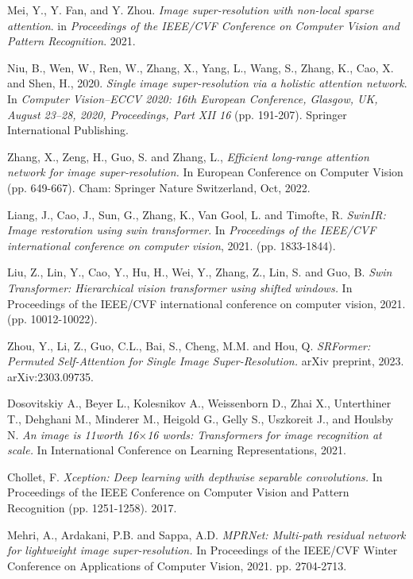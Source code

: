 \documentclass[twocolumn]{svjour3}          %
\begin{document}
\begin{thebibliography}{00}
 Mei, Y., Y. Fan, and Y. Zhou. \textit{Image super-resolution with non-local sparse attention}. in \textit{Proceedings of the IEEE/CVF Conference on Computer Vision and Pattern Recognition}. 2021.

 Niu, B., Wen, W., Ren, W., Zhang, X., Yang, L., Wang, S., Zhang, K., Cao, X. and Shen, H., 2020. \textit{Single image super-resolution via a holistic attention network}. In \textit{Computer Vision–ECCV 2020: 16th European Conference, Glasgow, UK, August 23–28, 2020, Proceedings, Part XII 16} (pp. 191-207). Springer International Publishing.

 Zhang, X., Zeng, H., Guo, S. and Zhang, L., \textit{Efficient long-range attention network for image super-resolution.} In European Conference on Computer Vision (pp. 649-667). Cham: Springer Nature Switzerland, Oct, 2022.

 Liang, J., Cao, J., Sun, G., Zhang, K., Van Gool, L. and Timofte, R. \textit{SwinIR: Image restoration using swin transformer}. In \textit{Proceedings of the IEEE/CVF international conference on computer vision}, 2021. (pp. 1833-1844).

 Liu, Z., Lin, Y., Cao, Y., Hu, H., Wei, Y., Zhang, Z., Lin, S. and Guo, B. \textit{Swin Transformer: Hierarchical vision transformer using shifted windows.} In Proceedings of the IEEE/CVF international conference on computer vision, 2021. (pp. 10012-10022).

 Zhou, Y., Li, Z., Guo, C.L., Bai, S., Cheng, M.M. and Hou, Q. \textit{SRFormer: Permuted Self-Attention for Single Image Super-Resolution.} arXiv preprint, 2023. arXiv:2303.09735.

 Dosovitskiy A., Beyer L., Kolesnikov A., Weissenborn D., Zhai X., Unterthiner T., Dehghani M., Minderer M., Heigold G., Gelly S., Uszkoreit J., and Houlsby N. \textit{An image is 11worth 16$\times$16 words: Transformers for image recognition at scale.} In International Conference on Learning Representations, 2021.

 Chollet, F. \textit{Xception: Deep learning with depthwise separable convolutions.} In Proceedings of the IEEE Conference on Computer Vision and Pattern Recognition (pp. 1251-1258). 2017.

 Mehri, A., Ardakani, P.B. and Sappa, A.D. \textit{MPRNet: Multi-path residual network for lightweight image super-resolution.} In Proceedings of the IEEE/CVF Winter Conference on Applications of Computer Vision, 2021. pp. 2704-2713.


\end{thebibliography}
\end{document}
